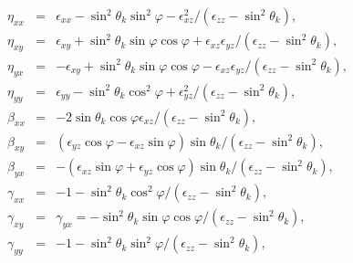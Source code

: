 \documentclass{aa}
\begin{document}
\begin{eqnarray}
\eta_{xx} & = & \epsilon_{xx} - \sin^2\theta_k\sin^2\varphi
- \epsilon^2_{xz}/\left(
\epsilon_{zz}-\sin^2\theta_k\right),\\
\eta_{xy} & = & \epsilon_{xy} +
\sin^2\theta_k\sin\varphi\cos\varphi + 
\epsilon_{xz}\epsilon_{yz}/\left(\epsilon_{zz}-\sin^2\theta_k\right),\\
\eta_{yx} & = & -\epsilon_{xy} +
\sin^2\theta_k\sin\varphi\cos\varphi -
\epsilon_{xz}\epsilon_{yz}/\left(\epsilon_{zz}-\sin^2\theta_k\right),\\
\eta_{yy} & = & \epsilon_{yy} - \sin^2\theta_k\cos^2\varphi
+ \epsilon_{yz}^2/\left(
\epsilon_{zz}-\sin^2\theta_k\right),\\
\beta_{xx} & = &
-2\sin\theta_k\cos\varphi\epsilon_{xz}/\left(
\epsilon_{zz}-\sin^2\theta_k\right),\\
\beta_{xy} & = &
\left(\epsilon_{yz}\cos\varphi-\epsilon_{xz}\sin\varphi\right)
\sin\theta_k/\left(\epsilon_{zz}-\sin^2\theta_k\right),\\
\beta_{yx} & = & -\left(\epsilon_{xz}\sin\varphi +
\epsilon_{yz}\cos\varphi\right)
\sin\theta_k/\left(\epsilon_{zz}-\sin^2\theta_k\right),\\
\gamma_{xx} & = & - 1 - \sin^2\theta_k\cos^2\varphi/
\left(\epsilon_{zz}-\sin^2\theta_k\right),\\
\gamma_{xy} & = & \gamma_{yx}
= -\sin^2\theta_k\sin\varphi\cos\varphi/
\left(\epsilon_{zz}-\sin^2\theta_k\right),\\
\gamma_{yy} & = & - 1 - \sin^2\theta_k\sin^2\varphi/
\left(\epsilon_{zz}-\sin^2\theta_k\right),
\label{eq:gammayy}
\end{eqnarray}
\end{document}
